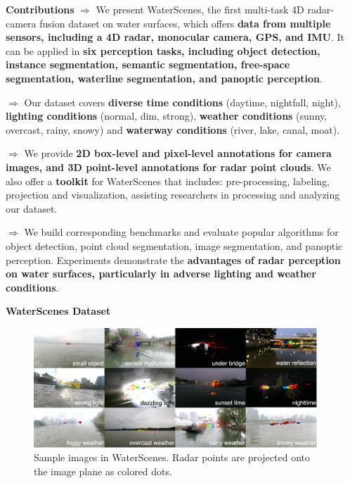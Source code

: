 \documentclass[final]{beamer}
\newlength{\sepwidthB}
\newlength{\colwidthB}
\newcommand{\separatorcolumnB}{\begin{column}{\sepwidthB}\end{column}}
\begin{document}
\begin{frame}[t]
\begin{columns}
\separatorcolumnB
\begin{column}[T]{\colwidthB}
\begin{block}{\Large{\textbf{Contributions}}}
\vspace{0.5cm}
\large
$\Rightarrow$ We present WaterScenes, the first multi-task 4D radar-camera fusion dataset on water surfaces, which offers \textbf{data from multiple sensors, including a 4D radar, monocular camera, GPS, and IMU}. It can be applied in \textbf{six perception tasks, including object detection, instance segmentation, semantic segmentation, free-space segmentation, waterline segmentation, and panoptic perception}.

$\Rightarrow$ Our dataset covers \textbf{diverse time conditions} (daytime, nightfall, night), \textbf{lighting conditions} (normal, dim, strong), \textbf{weather conditions} (sunny, overcast, rainy, snowy) and \textbf{waterway conditions} (river, lake, canal, moat). 

$\Rightarrow$ We provide \textbf{2D box-level and pixel-level annotations for camera images, and 3D point-level annotations for radar point clouds}. We also offer a \textbf{toolkit} for WaterScenes that includes: pre-processing, labeling, projection and visualization, assisting researchers in processing and analyzing our dataset.

$\Rightarrow$ We build corresponding benchmarks and evaluate popular algorithms for object detection, point cloud segmentation, image segmentation, and panoptic perception. Experiments demonstrate the \textbf{advantages of radar perception on water surfaces, particularly in adverse lighting and weather conditions}.
\end{block}
    
\begin{block}{\Large{\textbf{WaterScenes Dataset}}}
\vspace{1cm}
\begin{figure}
\centering
\includegraphics[width=1\textwidth]{images/samples}
\caption{Sample images in WaterScenes. Radar points are projected onto the image plane as colored dots.}
\end{figure}
\vspace{-1cm}


\end{block}
\end{column}
\end{columns}
\end{frame}
\end{document}
